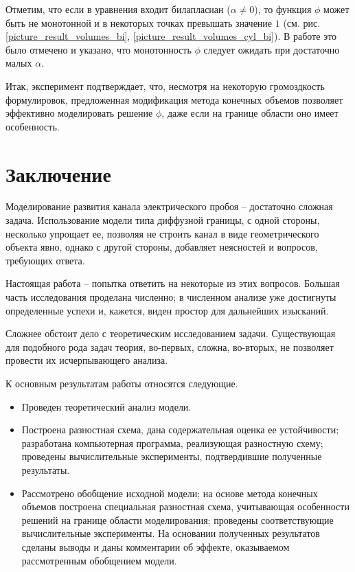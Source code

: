 \documentclass[a4paper,12pt]{article}
\theoremstyle{plain}
\theoremstyle{definition}
\begin{document}
Отметим, что если в уравнения входит билапласиан ($\alpha \neq 0$), то функция $\phi$ может быть не монотонной и в некоторых точках превышать значение $1$ (см. рис. \ref{picture_result_volumes_bi}, \ref{picture_result_volumes_cyl_bi}). В работе \cite{zipunova_higher_codimension} это было отмечено и указано, что монотонность $\phi$ следует ожидать при достаточно малых $\alpha$.

Итак, эксперимент подтверждает, что, несмотря на некоторую громоздкость формулировок, предложенная модификация метода конечных объемов позволяет эффективно моделировать решение $\phi$, даже если на границе области оно имеет особенность.


\section{Заключение}

Моделирование развития канала электрического пробоя -- достаточно сложная задача. Использование модели типа диффузной границы, с одной стороны, несколько упрощает ее, позволяя не строить канал в виде геометрического объекта явно, однако с другой стороны, добавляет неясностей и вопросов, требующих ответа.

Настоящая работа -- попытка ответить на некоторые из этих вопросов. Большая часть исследования проделана численно; в численном анализе уже достигнуты определенные успехи и, кажется, виден простор для дальнейших изысканий.

Сложнее обстоит дело с теоретическим исследованием задачи. Существующая для подобного рода задач теория, во-первых, сложна, во-вторых, не позволяет провести их исчерпывающего анализа.

К основным результатам работы относятся следующие.
\begin{itemize}
    \item Проведен теоретический анализ модели.
    \item Построена разностная схема, дана содержательная оценка ее устойчивости; разработана компьютерная программа, реализующая разностную схему; проведены вычислительные эксперименты, подтвердившие полученные результаты. 
    \item Рассмотрено обобщение исходной модели; на основе метода конечных объемов построена специальная разностная схема, учитывающая особенности решений на границе области моделирования; проведены соответствующие вычислительные эксперименты. На основании полученных результатов сделаны выводы и даны комментарии об эффекте, оказываемом рассмотренным обобщением модели.
\end{itemize}


\printbibliography
\end{document}
